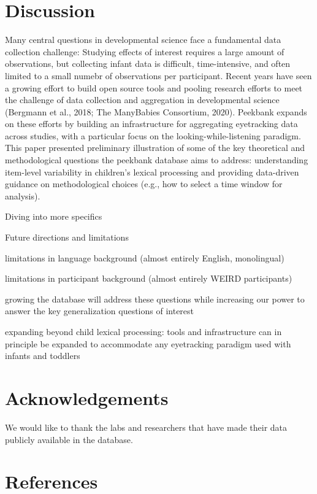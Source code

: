\documentclass[10pt, letterpaper]{article}
\begin{document}
\hypertarget{discussion}{%
\section{Discussion}\label{discussion}}

Many central questions in developmental science face a fundamental data
collection challenge: Studying effects of interest requires a large
amount of observations, but collecting infant data is difficult,
time-intensive, and often limited to a small numebr of observations per
participant. Recent years have seen a growing effort to build open
source tools and pooling research efforts to meet the challenge of data
collection and aggregation in developmental science (Bergmann et al.,
2018; The ManyBabies Consortium, 2020). Peekbank expands on these
efforts by building an infrastructure for aggregating eyetracking data
across studies, with a particular focus on the looking-while-listening
paradigm. This paper presented preliminary illustration of some of the
key theoretical and methodological questions the peekbank database aims
to address: understanding item-level variability in children's lexical
processing and providing data-driven guidance on methodological choices
(e.g., how to select a time window for analysis).

Diving into more specifics

Future directions and limitations

limitations in language background (almost entirely English,
monolingual)

limitations in participant background (almost entirely WEIRD
participants)

growing the database will address these questions while increasing our
power to answer the key generalization questions of interest

expanding beyond child lexical processing: tools and infrastructure can
in principle be expanded to accommodate any eyetracking paradigm used
with infants and toddlers

\hypertarget{acknowledgements}{%
\section{Acknowledgements}\label{acknowledgements}}

We would like to thank the labs and researchers that have made their
data publicly available in the database.

\hypertarget{references}{%
\section{References}\label{references}}
\end{document}
